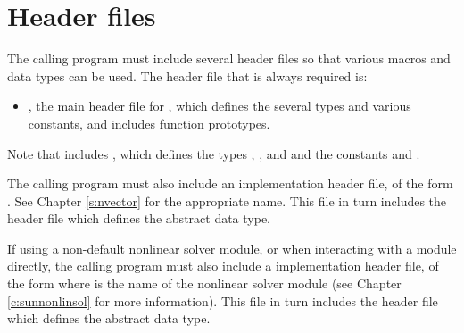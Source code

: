 \section{Header files}\label{ss:header_sim}
The calling program must include several header files so that various macros
and data types can be used. The header file that is always required is:
\begin{itemize}
\item  {},
  the main header file for {\cvode}, which defines the several
  types and various constants, and includes function prototypes.
\end{itemize}
Note that  includes ,
which defines the types , , and 
and the constants  and .

The calling program must also include an {\nvector} implementation header file,
of the form .  See Chapter \ref{s:nvector}
for the appropriate name.  This file in turn includes the header file
 which defines the abstract  data type.

If using a non-default nonlinear solver module, or when interacting
with a {\sunnonlinsol} module directly, the calling program must also
include a {\sunnonlinsol} implementation header file, of the form
 where \id{***} is the name of the
nonlinear solver module (see Chapter \ref{c:sunnonlinsol} for more
information). This file in turn includes the header file
 which defines the abstract
 data type.

